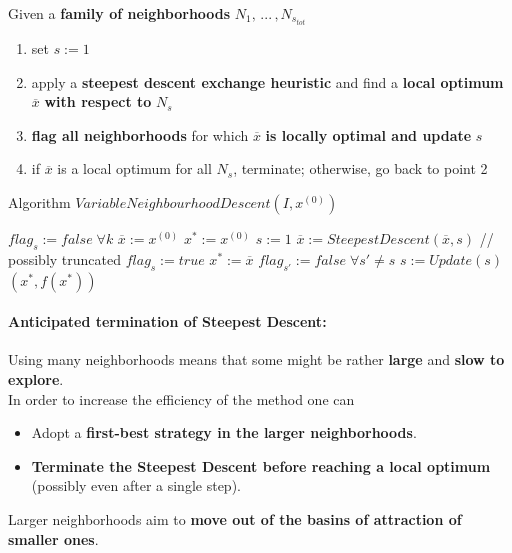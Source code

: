 \documentclass[11pt]{article}
\begin{document}
	Given a \textbf{family of neighborhoods} $N_1, \, ... \, , N_{s_{tot}}$
	\begin{enumerate}
		\item set $s := 1$
		\item apply a \textbf{steepest descent exchange heuristic} and find a \textbf{local optimum} $\overline{x}$ \textbf{with respect to} $N_s$
		\item \textbf{flag all neighborhoods} for which $\overline{x}$ \textbf{is locally optimal and update} $s$
		\item if $\overline{x}$ is a local optimum for all $N_s$, terminate; otherwise, go back to point 2
	\end{enumerate}
	
	\begin{algorithm}
		\caption{Algorithm $VariableNeighbourhoodDescent(I , x^{(0)})$}
		\begin{algorithmic}
			\STATE $flag_s := false \; \forall k$
			\STATE $\overline{x} := x^{(0)}$ 
			\STATE $x^\ast := x^{(0)}$
			\STATE $s := 1$
				\STATE $\overline{x} := SteepestDescent(\overline{x}, s)$ // possibly truncated
				\STATE $flag_s := true$
					\STATE $x^\ast := \overline{x}$
					\STATE $flag_{s'} := false \; \forall s' \neq s$
				\ENDIF
				\STATE $s := Update(s)$
			\ENDWHILE
			\RETURN $(x^\ast, f (x^\ast))$
		\end{algorithmic}
	\end{algorithm}
	
	\newpage
	
	\paragraph{Anticipated termination of Steepest Descent:} Using many neighborhoods means that some might be rather \textbf{large} and \textbf{slow to explore}.\\
	
	In order to increase the efficiency of the method one can
	\begin{itemize}
		\item Adopt a \textbf{first-best strategy in the larger neighborhoods}.\\
		
		\item \textbf{Terminate the Steepest Descent before reaching a local optimum} (possibly even after a single step).\\
		
	\end{itemize}
	Larger neighborhoods aim to \textbf{move out of the basins of attraction of smaller ones}.\\
	
\end{document}

